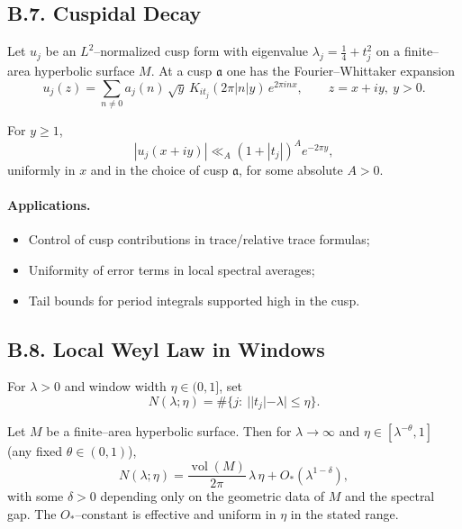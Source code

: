 %
\subsection*{B.7. Cuspidal Decay}

Let $u_j$ be an $L^2$–normalized cusp form with eigenvalue
$\lambda_j=\tfrac14+t_j^2$ on a finite–area hyperbolic surface $M$.
At a cusp $\mathfrak a$ one has the Fourier–Whittaker expansion
\[
  u_j(z)=\sum_{n\neq0} a_j(n)\,\sqrt y\,K_{it_j}(2\pi|n|y)\,e^{2\pi i n x},
  \qquad z=x+iy,\ y>0 .
\]

\begin{lemma}\label{lem:B7}
For $y\ge1$,
\begin{equation}
  |u_j(x+iy)| \ll_A (1+|t_j|)^A e^{-2\pi y},
\end{equation}
uniformly in $x$ and in the choice of cusp $\mathfrak a$, for some absolute $A>0$.
\end{lemma}

\paragraph{Applications.}
\begin{itemize}
  \item Control of cusp contributions in trace/relative trace formulas;
  \item Uniformity of error terms in local spectral averages;
  \item Tail bounds for period integrals supported high in the cusp.
\end{itemize}

%

%
\subsection*{B.8. Local Weyl Law in Windows}

For $\lambda>0$ and window width $\eta\in(0,1]$, set
\[
  N(\lambda;\eta)=\#\{j:\ ||t_j|-\lambda|\le\eta\}.
\]

\begin{theorem}\label{thm:B8}
Let $M$ be a finite–area hyperbolic surface. Then for $\lambda\to\infty$ and
$\eta\in[\lambda^{-\theta},1]$ (any fixed $\theta\in(0,1)$),
\begin{equation}
  N(\lambda;\eta)
  = \frac{\operatorname{vol}(M)}{2\pi}\,\lambda\,\eta
    + O_*\!\left(\lambda^{1-\delta}\right),
\end{equation}
with some $\delta>0$ depending only on the geometric data of $M$ and the spectral
gap. The $O_*$–constant is effective and uniform in $\eta$ in the stated range.
\end{theorem}

